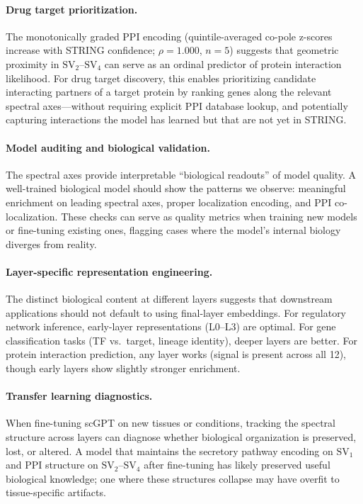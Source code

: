 \documentclass[10pt,twocolumn]{article}
\newcommand{\SV}[1]{\mathrm{SV}_{#1}}
\begin{document}
\paragraph{Drug target prioritization.}
The monotonically graded PPI encoding (quintile-averaged co-pole z-scores increase with STRING confidence; $\rho = 1.000$, $n = 5$) suggests that geometric proximity in $\SV{2}$--$\SV{4}$ can serve as an ordinal predictor of protein interaction likelihood.
For drug target discovery, this enables prioritizing candidate interacting partners of a target protein by ranking genes along the relevant spectral axes---without requiring explicit PPI database lookup, and potentially capturing interactions the model has learned but that are not yet in STRING.

\paragraph{Model auditing and biological validation.}
The spectral axes provide interpretable ``biological readouts'' of model quality.
A well-trained biological model should show the patterns we observe: meaningful enrichment on leading spectral axes, proper localization encoding, and PPI co-localization.
These checks can serve as quality metrics when training new models or fine-tuning existing ones, flagging cases where the model's internal biology diverges from reality.

\paragraph{Layer-specific representation engineering.}
The distinct biological content at different layers suggests that downstream applications should not default to using final-layer embeddings.
For regulatory network inference, early-layer representations (L0--L3) are optimal.
For gene classification tasks (TF vs.\ target, lineage identity), deeper layers are better.
For protein interaction prediction, any layer works (signal is present across all 12), though early layers show slightly stronger enrichment.

\paragraph{Transfer learning diagnostics.}
When fine-tuning scGPT on new tissues or conditions, tracking the spectral structure across layers can diagnose whether biological organization is preserved, lost, or altered.
A model that maintains the secretory pathway encoding on $\SV{1}$ and PPI structure on $\SV{2}$--$\SV{4}$ after fine-tuning has likely preserved useful biological knowledge; one where these structures collapse may have overfit to tissue-specific artifacts.
\end{document}
